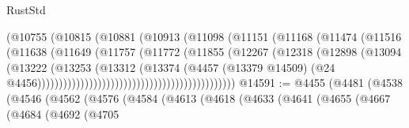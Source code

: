 \begin{lexlean}{RustStd}
\begin{coremodule}
                                                (@10755
                                                  (@10815
                                                    (@10881
                                                      (@10913
                                                        (@11098
                                                          (@11151
                                                            (@11168
                                                              (@11474
                                                                (@11516
                                                                  (@11638
                                                                    (@11649
                                                                      (@11757
                                                                        (@11772
                                                                          (@11855
                                                                            (@12267
                                                                              (@12318
                                                                                (@12898
                                                                                  (@13094
                                                                                    (@13222
                                                                                      (@13253
                                                                                        (@13312
                                                                                          (@13374
                                                                                            (@4457
                                                                                              (@13379
                                                                                                @14509)
                                                                                              (@24
                                                                                                @4456))))))))))))))))))))))))))))))))))))))))))))))
@14591 := @4455
    (@4481
      (@4538
        (@4546
          (@4562
            (@4576
              (@4584
                (@4613
                  (@4618
                    (@4633
                      (@4641
                        (@4655
                          (@4667
                            (@4684
                              (@4692
                                (@4705

\end{coremodule}
\end{lexlean}
